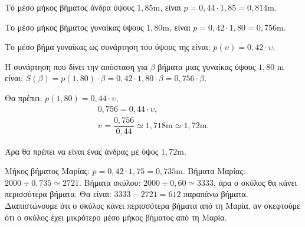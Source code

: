 
\begin{alist}
\item
\begin{rlist}
\item Το μέσο μήκος βήματος άνδρα ύψους $1,85\text{m}$, είναι $p = 0,44 \cdot 1,85 = 0,814\text{m}$.
\item Το μέσο μήκος βήματος γυναίκας ύψους $1,80\text{m}$, είναι $p = 0,42 \cdot 1,80 = 0,756\text{m}$.
\end{rlist}

\item
\begin{rlist}
\item Το μέσο βήμα γυναίκας ως συνάρτηση του ύψους της είναι: $p(\upsilon) = 0,42 \cdot \upsilon$.
\item Η συνάρτηση που δίνει την απόσταση για $\beta$ βήματα μιας γυναίκας ύψους $1,80 \text{ m}$ είναι: $S(\beta) = p(1,80) \cdot \beta = 0,42 \cdot 1,80 \cdot \beta = 0,756 \cdot \beta$.
\end{rlist}

\item Θα πρέπει: $p(1,80) = 0,44 \cdot \upsilon$,
\begin{gather*}
0,756 = 0,44 \cdot \upsilon, \\
\upsilon = \dfrac{0,756}{0,44} \simeq 1,718\text{m} \simeq 1,72\text{m}.
\end{gather*}

Άρα θα πρέπει να είναι ένας άνδρας με ύψος $1,72\text{m}$.

\item Μήκος βήματος Μαρίας: $p = 0,42 \cdot 1,75 = 0,735\text{m}$.
Βήματα Μαρίας: $2000 \div 0,735 \simeq 2721$.
Βήματα σκύλου: $2000 \div 0,60 \simeq 3333$, άρα ο σκύλος θα κάνει περισσότερα βήματα.
Θα είναι: $3333 - 2721 = 612$ παραπάνω βήματα.
Διαπιστώνουμε ότι ο σκύλος κάνει περισσότερα βήματα από τη Μαρία, αν σκεφτούμε ότι ο σκύλος έχει μικρότερο μέσο μήκος βήματος από τη Μαρία.
\end{alist}

